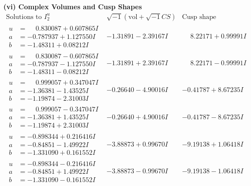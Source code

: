 \documentclass[1p]{elsarticle_modified}
\theoremstyle{definition}
\newcommand{\I}{\sqrt{-1}}
\begin{document}
\newpage\flushleft \textbf{(vi) Complex Volumes and Cusp Shapes}
$$\begin{array}{c|c|c}  
\text{Solutions to }I^u_{2}& \I (\text{vol} + \sqrt{-1}CS) & \text{Cusp shape}\\
 \hline 
\begin{aligned}
u &= \phantom{-}0.830087 + 0.607865 I \\
a &= -0.787937 + 1.127550 I \\
b &= -1.48311 + 0.08212 I\end{aligned}
 & -1.31891 - 2.39167 I & \phantom{-}8.22171 + 0.99991 I \\ \hline\begin{aligned}
u &= \phantom{-}0.830087 - 0.607865 I \\
a &= -0.787937 - 1.127550 I \\
b &= -1.48311 - 0.08212 I\end{aligned}
 & -1.31891 + 2.39167 I & \phantom{-}8.22171 - 0.99991 I \\ \hline\begin{aligned}
u &= \phantom{-}0.999057 + 0.347047 I \\
a &= -1.36381 - 1.43525 I \\
b &= -1.19874 - 2.31003 I\end{aligned}
 & -0.26640 - 4.90016 I & -0.41787 + 8.67235 I \\ \hline\begin{aligned}
u &= \phantom{-}0.999057 - 0.347047 I \\
a &= -1.36381 + 1.43525 I \\
b &= -1.19874 + 2.31003 I\end{aligned}
 & -0.26640 + 4.90016 I & -0.41787 - 8.67235 I \\ \hline\begin{aligned}
u &= -0.898344 + 0.216416 I \\
a &= -0.84851 - 1.49922 I \\
b &= -1.331090 + 0.161552 I\end{aligned}
 & -3.88873 + 0.99670 I & -9.19138 + 1.06418 I \\ \hline\begin{aligned}
u &= -0.898344 - 0.216416 I \\
a &= -0.84851 + 1.49922 I \\
b &= -1.331090 - 0.161552 I\end{aligned}
 & -3.88873 - 0.99670 I & -9.19138 - 1.06418 I \\ \hline\begin{aligned}

\end{aligned}
\end{array}$$
\end{document}
